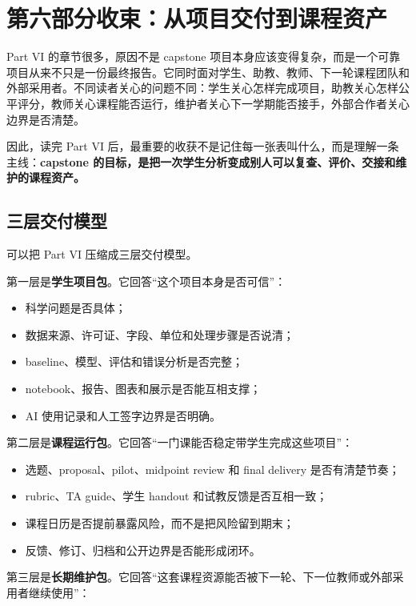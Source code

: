 \chapter*{第六部分收束：从项目交付到课程资产}

Part VI 的章节很多，原因不是 capstone 项目本身应该变得复杂，而是一个可靠项目从来不只是一份最终报告。它同时面对学生、助教、教师、下一轮课程团队和外部采用者。不同读者关心的问题不同：学生关心怎样完成项目，助教关心怎样公平评分，教师关心课程能否运行，维护者关心下一学期能否接手，外部合作者关心边界是否清楚。

因此，读完 Part VI 后，最重要的收获不是记住每一张表叫什么，而是理解一条主线：\textbf{capstone 的目标，是把一次学生分析变成别人可以复查、评价、交接和维护的课程资产。}

\section*{三层交付模型}

可以把 Part VI 压缩成三层交付模型。

第一层是\textbf{学生项目包}。它回答“这个项目本身是否可信”：

\begin{itemize}
    \item 科学问题是否具体；
    \item 数据来源、许可证、字段、单位和处理步骤是否说清；
    \item baseline、模型、评估和错误分析是否完整；
    \item notebook、报告、图表和展示是否能互相支撑；
    \item AI 使用记录和人工签字边界是否明确。
\end{itemize}

第二层是\textbf{课程运行包}。它回答“一门课能否稳定带学生完成这些项目”：

\begin{itemize}
    \item 选题、proposal、pilot、midpoint review 和 final delivery 是否有清楚节奏；
    \item rubric、TA guide、学生 handout 和试教反馈是否互相一致；
    \item 课程日历是否提前暴露风险，而不是把风险留到期末；
    \item 反馈、修订、归档和公开边界是否能形成闭环。
\end{itemize}

第三层是\textbf{长期维护包}。它回答“这套课程资源能否被下一轮、下一位教师或外部采用者继续使用”：


